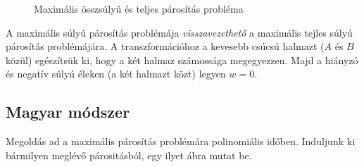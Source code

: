 \begin{figure}[htb]
\caption{Maximális összsúlyú és teljes párosítás probléma}
\label{fig:OptMaxNemEkv}
\centering
{} 
\end{figure}

A maximális súlyú párosítás problémája \emph{visszavezethető} a maximális tejles
súlyú párosítás problémájára. A transzformációhoz a kevesebb csúcsú halmazt ($A$
és $B$ közül) egészítsük ki, hogy a két halmaz számossága megegyezzen. Majd a
hiányzó és negatív súlyú éleken (a két halmazt közt) legyen $w=0$. 

\subsection{Magyar módszer}

Megoldás ad a maximális párosítás problémára polinomiális időben. Induljunk ki
bármilyen meglévő párositásból, egy ilyet  ábra
mutat be.


